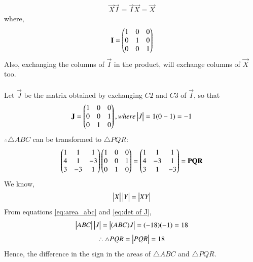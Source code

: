 \documentclass[journal,12pt,twocolumn]{IEEEtran}
\renewcommand\thesection{\arabic{section}}
\begin{document}
\begin{enumerate}[label=\thesection.\arabic*.,ref=\thesection.\theenumi]
\begin{align}
\vec{X}\vec{I}=\vec{I}\vec{X}=\vec{X} 
\end{align} where,
\begin{align}
\mathbf{I}=\begin{pmatrix}1 & 0 & 0\\0 & 1 & 0\\ 0 & 0 & 1\end{pmatrix}
\end{align}
Also, exchanging the columns of $\vec{I}$ in the product, will exchange columns of $\vec{X}$ too.\\\\
Let $\vec{J}$ be the matrix obtained by exchanging $C2$ and $C3$ of $\vec{I}$, so that
\begin{align}
\label{eq:det of J}
\mathbf{J}=\begin{pmatrix}1 & 0 & 0\\0 & 0 & 1\\ 0 & 1 & 0\end{pmatrix} , where \begin{vmatrix}J\end{vmatrix} =1(0-1)=-1
\end{align}
$\therefore\triangle ABC$ can be transformed to $\triangle PQR$:
\begin{align}
\begin{pmatrix}1 & 1 & 1 \\ 4 & 1 & -3\\ 3 & -3 & 1\end{pmatrix}
\begin{pmatrix}1 & 0 & 0\\ 0 & 0 & 1\\0 & 1 & 0\end{pmatrix}=
\begin{pmatrix}1 & 1 & 1\\4 & -3 & 1\\ 3 & 1 & -3\end{pmatrix}=\mathbf{PQR}
\end{align}
We know,\begin{equation}\label{eq:det_prop}
\begin{vmatrix}X\end{vmatrix}\begin{vmatrix}Y\end{vmatrix}=\begin{vmatrix}XY\end{vmatrix}
\end{equation}
From equations \eqref{eq:area_abc} and \eqref{eq:det of J},
\begin{equation}
\begin{vmatrix}ABC\end{vmatrix}\begin{vmatrix}J\end{vmatrix}=\begin{vmatrix}(ABC)J\end{vmatrix}=(-18)(-1)=18
\end{equation}
\begin{align}\label{eq:area_pqr}
\therefore\triangle PQR=\begin{vmatrix}PQR\end{vmatrix}=18
\end{align}
Hence, the difference in the sign in the areas of $\triangle ABC$ and $\triangle PQR$.

\end{enumerate}
\end{document}

